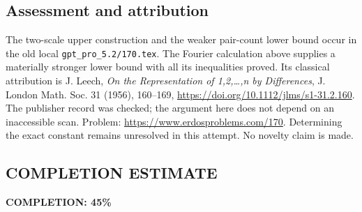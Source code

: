 \subsection*{Assessment and attribution}
The two-scale upper construction and the weaker pair-count lower bound occur in the old local \texttt{gpt\_pro\_5.2/170.tex}. The Fourier calculation above supplies a materially stronger lower bound with all its inequalities proved. Its classical attribution is J. Leech, \emph{On the Representation of 1,2,\ldots,n by Differences}, J. London Math. Soc. 31 (1956), 160--169, \url{https://doi.org/10.1112/jlms/s1-31.2.160}. The publisher record was checked; the argument here does not depend on an inaccessible scan. Problem: \url{https://www.erdosproblems.com/170}.
Determining the exact constant remains unresolved in this attempt. No novelty claim is made.
\subsection*{COMPLETION ESTIMATE}
\textbf{COMPLETION: 45\%}
